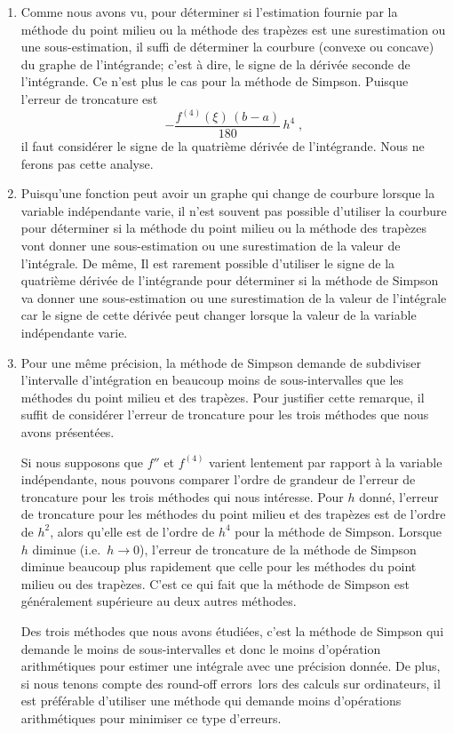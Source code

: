 {\begin{rmkList}
\begin{enumerate}
\item Comme nous avons vu, pour déterminer si l'estimation fournie par la
méthode du point milieu ou la méthode des trapèzes est une
surestimation ou une sous-estimation, il suffi de déterminer la
courbure (convexe ou concave) du graphe de l'intégrande; c'est à dire,
le signe de la dérivée seconde de l'intégrande.
Ce n'est plus le cas pour la méthode de Simpson.  Puisque l'erreur de
troncature est
\[
- \frac{f^{(4)}(\xi)\,(b-a)}{180}\, h^4  \; ,
\]
il faut considérer le signe de la quatrième dérivée de l'intégrande.
Nous ne ferons pas cette analyse.
\item Puisqu'une fonction peut avoir un graphe qui change de courbure
lorsque la variable indépendante varie, il n'est souvent pas possible
d'utiliser la courbure pour déterminer si la méthode du point milieu
ou la méthode des trapèzes vont donner une sous-estimation ou une
surestimation de la valeur de l'intégrale.  De même, Il est rarement
possible d'utiliser le signe de la quatrième dérivée de l'intégrande
pour déterminer si la méthode de Simpson va donner une sous-estimation
ou une surestimation de la valeur de l'intégrale car le signe de cette
dérivée peut changer lorsque la valeur de la variable indépendante
varie.
\item Pour une même précision, la méthode de Simpson demande de
subdiviser l'intervalle d'intégration en beaucoup moins de
sous-intervalles que les méthodes du point milieu et des
trapèzes. Pour justifier cette remarque, il suffit de considérer
l'erreur de troncature pour les trois méthodes que nous avons présentées.

Si nous supposons que $f''$ et $f^{(4)}$ varient lentement par rapport à
la variable indépendante, nous pouvons comparer l'ordre de grandeur de
l'erreur de troncature pour les trois méthodes qui nous intéresse.
Pour $h$ donné, l'erreur de troncature pour les méthodes du point
milieu et des trapèzes est de l'ordre de $h^2$, alors qu'elle est de
l'ordre de $h^4$ pour la méthode de Simpson.  Lorsque $h$ diminue
(i.e.\ $h \to 0$), l'erreur de troncature de la méthode de Simpson
diminue beaucoup plus rapidement que celle pour les méthodes du point
milieu ou des trapèzes.  C'est ce qui fait que la méthode de Simpson
est généralement supérieure au deux autres méthodes.

Des trois méthodes que nous avons étudiées, c'est la méthode de Simpson
qui demande le moins de sous-intervalles et donc le moins d'opération
arithmétiques pour estimer une intégrale avec une précision donnée. De
plus, si nous tenons compte des \lgm round-off errors\rgm\ lors des
calculs sur ordinateurs, il est préférable d'utiliser une méthode qui
demande moins d'opérations arithmétiques pour minimiser ce type d'erreurs.
\end{enumerate}
\end{rmkList}

}  %


